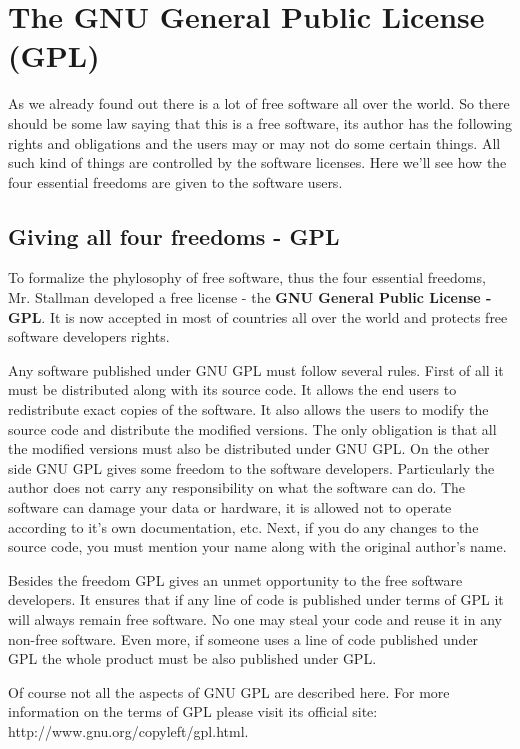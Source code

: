 \section{The GNU General Public License (GPL)}
\label{gpl}
As we already found out there is a lot of free software all over the world. So there should be some law saying that this is a free software, its author has the following rights and obligations and the users may or may not do some certain things. All such kind of things are controlled by the software licenses. Here we'll see how the  four essential freedoms are given to the software users.

\subsection{Giving all four freedoms - GPL}
To formalize the phylosophy of free software, thus the four essential freedoms, Mr. Stallman developed a free license - the \textbf {GNU General Public License - GPL}. It is now accepted in most of countries all over the world and protects free software developers rights.

Any software published under GNU GPL must follow several rules. First of all it must be distributed along with its source code. It allows the end users to redistribute exact copies of the software. It also allows the users to modify the source code and distribute the modified versions. The only obligation is that all the modified versions must also be distributed under GNU GPL. On the other side GNU GPL gives some freedom to the software developers. Particularly the author does not carry any responsibility on what the software can do. The software can damage your data or hardware, it is allowed not to operate according to it's own documentation, etc. Next, if you do any changes to the source code, you must mention your name along with the original author's name.

Besides the freedom GPL gives an unmet opportunity to the free software developers. It ensures that if any line of code is published under terms of GPL it will always remain free software. No one may steal your code and reuse it in any non-free software. Even more, if someone uses a line of code published under GPL the whole product must be also published under GPL.

Of course not all the aspects of GNU GPL are described here. For more information on the terms of GPL please visit its official site: http://www.gnu.org/copyleft/gpl.html.

